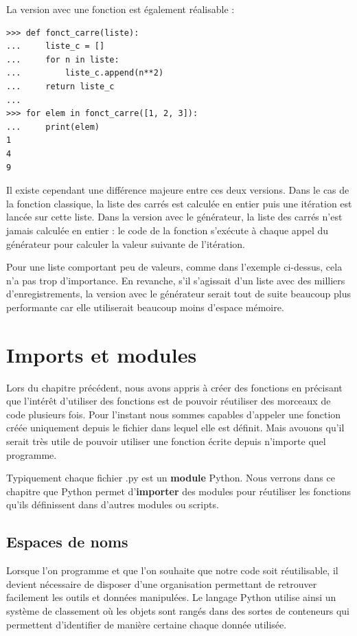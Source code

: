 \documentclass[12pt, a4paper]{article}
\begin{document}
La version avec une fonction est également réalisable :
\begin{lstlisting}
>>> def fonct_carre(liste):
...     liste_c = []
...     for n in liste:
...         liste_c.append(n**2)
...     return liste_c
...
>>> for elem in fonct_carre([1, 2, 3]):
...     print(elem)
1
4
9
\end{lstlisting}

Il existe cependant une différence majeure entre ces deux versions. Dans le cas de la fonction classique, la liste des carrés est calculée en entier puis une itération est lancée sur cette liste. Dans la version avec le générateur, la liste des carrés n'est jamais calculée en entier : le code de la fonction s'exécute à chaque appel du générateur pour calculer la valeur suivante de l'itération.

Pour une liste comportant peu de valeurs, comme dans l'exemple ci-dessus, cela n'a pas trop d'importance. En revanche, s'il s'agissait d'un liste avec des milliers d'enregistrements, la version avec le générateur serait tout de suite beaucoup plus performante car elle utiliserait beaucoup moins d'espace mémoire.



\section{Imports et modules}
\label{sec:modules}
Lors du chapitre précédent, nous avons appris à créer des fonctions en précisant que l'intérêt d'utiliser des fonctions est de pouvoir réutiliser des morceaux de code plusieurs fois. Pour l'instant nous sommes capables d'appeler une fonction créée uniquement depuis le fichier dans lequel elle est définit. Mais avouons qu'il serait très utile de pouvoir utiliser une fonction écrite depuis n'importe quel programme. 

Typiquement chaque fichier .py est un \textbf{module} Python. Nous verrons dans ce chapitre que Python permet d'\textbf{importer} des modules pour réutiliser les fonctions qu'ils définissent dans d'autres modules ou scripts.

\subsection{Espaces de noms}
Lorsque l'on programme et que l'on souhaite que notre code soit réutilisable, il devient nécessaire de disposer d'une organisation permettant de retrouver facilement les outils et données manipulées. Le langage Python utilise ainsi un système de classement où les objets sont rangés dans des sortes de conteneurs qui permettent d'identifier de manière certaine chaque donnée utilisée.
\end{document}
